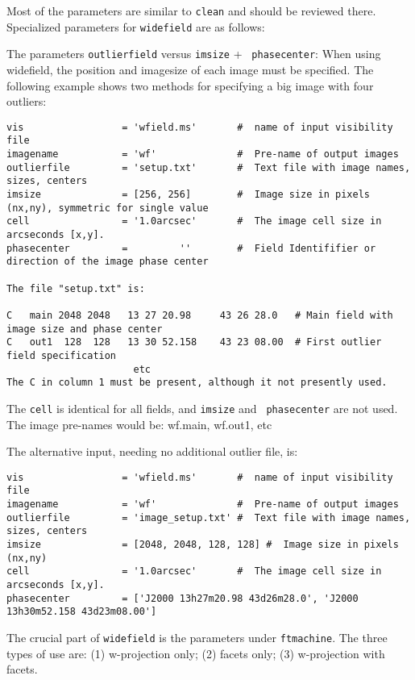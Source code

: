 \documentclass[11pt]{report}
\begin{document}
\noindent Most of the parameters are similar to {\tt clean} and should be reviewed
there.  Specialized parameters for {\tt widefield} are as follows:

The parameters {\tt outlierfield} versus {\tt imsize} + {\tt
phasecenter}: When using widefield, the position and imagesize of each
image must be specified.  The following example shows two methods for
specifying a big image with four outliers:

\scriptsize
\begin {verbatim}
vis                 = 'wfield.ms'       #  name of input visibility file
imagename           = 'wf'              #  Pre-name of output images
outlierfile         = 'setup.txt'       #  Text file with image names, sizes, centers
imsize              = [256, 256]        #  Image size in pixels (nx,ny), symmetric for single value
cell                = '1.0arcsec'       #  The image cell size in arcseconds [x,y].
phasecenter         =         ''        #  Field Identififier or direction of the image phase center

The file "setup.txt" is:

C   main 2048 2048   13 27 20.98     43 26 28.0   # Main field with image size and phase center
C   out1  128  128   13 30 52.158    43 23 08.00  # First outlier field specification
                      etc
The C in column 1 must be present, although it not presently used.
\end{verbatim}
\normalsize

\noindent The {\tt cell} is identical for all fields, and {\tt imsize} and {\tt
phasecenter} are not used.  The image pre-names would be: wf.main,
wf.out1, etc

The alternative input, needing no additional outlier file, is: 

\scriptsize
\begin{verbatim}
vis                 = 'wfield.ms'       #  name of input visibility file
imagename           = 'wf'              #  Pre-name of output images
outlierfile         = 'image_setup.txt' #  Text file with image names, sizes, centers
imsize              = [2048, 2048, 128, 128] #  Image size in pixels (nx,ny)
cell                = '1.0arcsec'       #  The image cell size in arcseconds [x,y].
phasecenter         = ['J2000 13h27m20.98 43d26m28.0', 'J2000 13h30m52.158 43d23m08.00']
\end{verbatim}
\normalsize

The crucial part of {\tt widefield} is the parameters under {\tt ftmachine}.  The three
types of use are: (1) w-projection only; (2) facets only; (3) w-projection with facets.
\end{document}
